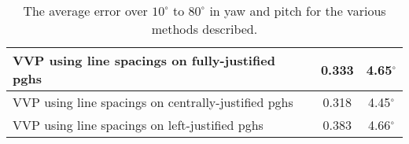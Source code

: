 \begin{table}[t]
\begin{center}
\begin{tabular}{|p{95mm}|c|c|}
      VVP using line spacings on fully-justified pghs & 0.333 & 4.65$^\circ$ \\ \hline     
      VVP using line spacings on centrally-justified pghs & 0.318 & 4.45$^\circ$ \\ \hline
      VVP using line spacings on left-justified pghs & 0.383 & 4.66$^\circ$ \\ \hline 
   \end{tabular}
  \end{center}
  \caption{The average error over $10^\circ$ to $80^{\circ}$ in yaw and pitch for the various methods described.}
  \label{accuracytable}
\end{table}

